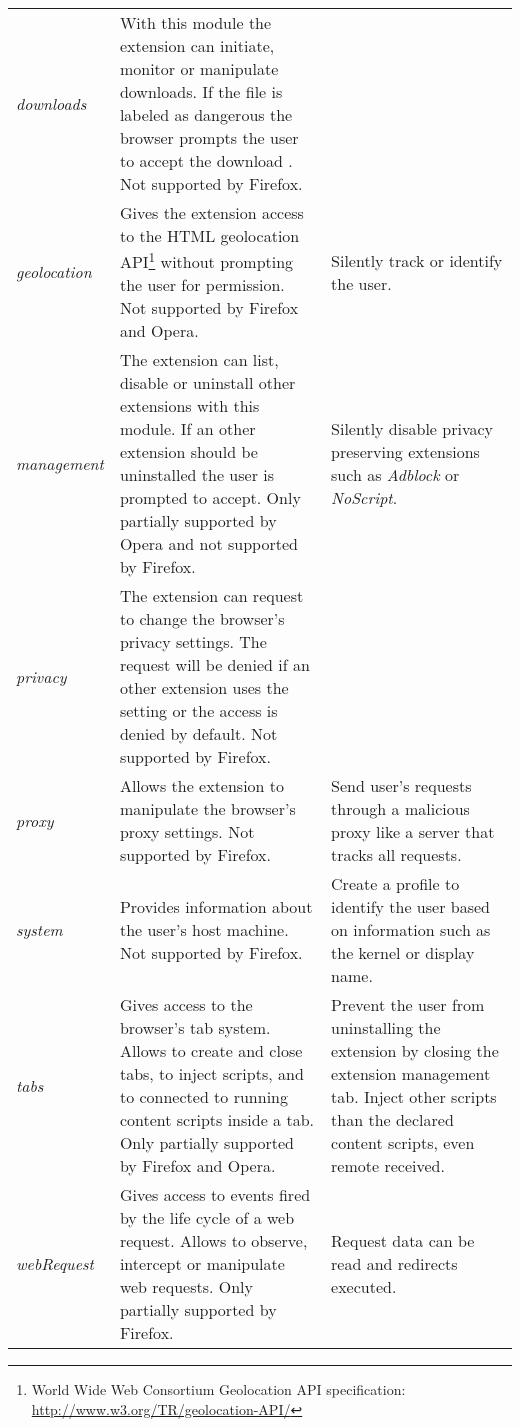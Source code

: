 \begin{tabular}{lp{}p{}}
		\textit{downloads} & With this module the extension can initiate, monitor or manipulate downloads. If the file is labeled as dangerous the browser prompts the user to accept the download \cite{chromeMaliciousDownloads}. Not supported by Firefox. &  \\
		
		\textit{geolocation} & Gives the extension access to the HTML geolocation API\footnote{World Wide Web Consortium Geolocation API specification: \url{http://www.w3.org/TR/geolocation-API/}} without prompting the user for permission. Not supported by Firefox and Opera. & Silently track or identify the user. \\
		
		\textit{management} & The extension can list, disable or uninstall other extensions with this module. If an other extension should be uninstalled the user is prompted to accept. Only partially supported by Opera and not supported by Firefox. & Silently disable privacy preserving extensions such as \textit{Adblock} or \textit{NoScript}. \\
		
		\textit{privacy} & The extension can request to change the browser's privacy settings. The request will be denied if an other extension uses the setting or the access is denied by default. Not supported by Firefox. & \\
		
		\textit{proxy} & Allows the extension to manipulate the browser's proxy settings. Not supported by Firefox. & Send user's requests through a malicious proxy like a server that tracks all requests. \\
		
		\textit{system} & Provides information about the user's host machine. Not supported by Firefox. & Create a profile to identify the user based on information such as the kernel or display name. \\
		
		\textit{tabs} & Gives access to the browser's tab system. Allows to create and close tabs, to inject scripts, and to connected to running content scripts inside a tab. Only partially supported by Firefox and Opera. & Prevent the user from uninstalling the extension by closing the extension management tab. Inject other scripts than the declared content scripts, even remote received. \\
		
		\textit{webRequest} & Gives access to events fired by the life cycle of a web request. Allows to observe, intercept or manipulate web requests. Only partially supported by Firefox. & Request data can be read and redirects executed. \\  	 	
		
	\end{tabular}
	
